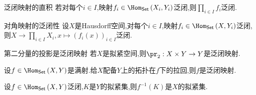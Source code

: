 \begin{corollary}{泛闭映射的直积}{}
	若对每个$i\in I$,映射$f_{i}\in\Hom_{\mathsf{Set}}\left(X_{i},Y_{i}\right)$泛闭,则$\prod\limits_{i\in I}f_{i}$泛闭.
\end{corollary}

\begin{corollary}{对角映射的泛闭性}{}
	设$X$是Hausdorff空间,对每个$i\in I$,映射$f_{i}\in\Hom_{\mathsf{Set}}\left(X,Y_{i}\right)$泛闭,则$X\to\prod\limits_{i\in I}X_{i},x\mapsto\left(f_{i}\left(x\right)\right)_{i\in I}$泛闭.
\end{corollary}

\begin{corollary}{第二分量的投影是泛闭映射}{}
	若$X$是拟紧空间,则$\pr_{2}:X\times Y\to Y$是泛闭映射.
\end{corollary}

\begin{remark}{}{}
	设$f\in\Hom_{\mathsf{Set}}\left(X,Y\right)$是满射.给$X$配备$Y$上的拓扑在$f$下的拉回,则$f$是泛闭映射.
\end{remark}

\begin{proposition}{}{}
	设$f\in\Hom_{\mathsf{Set}}\left(X,Y\right)$泛闭,$K$是$Y$的拟紧集,则$f^{-1}\left(K\right)$是$X$的拟紧集.
\end{proposition}





